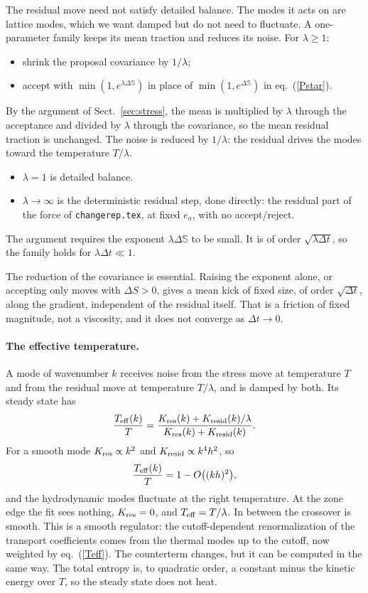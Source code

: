 \documentclass[11pt,aps,preprint,nofootinbib,superscriptaddress,tightenlines]{revtex4-2}
\def\st{\begin{equation}}
\def\stp{\end{equation}}
\def\Eq#1{eq.~(\ref{#1})}
\def\Sect#1{Sect.~\ref{#1}}
\let\oldparagraph\paragraph
\renewcommand{\paragraph}{\par\bigskip\oldparagraph}
\begin{document}
The residual move need not satisfy detailed
balance.  The modes it acts on are lattice modes, which we want damped but do
not need to fluctuate.  A one-parameter family keeps its mean traction and
reduces its noise.  For $\lambda\geq1$:
\begin{itemize}
\item shrink the proposal covariance by $1/\lambda$;
\item accept with $\min(1,e^{\lambda\Delta\mathbb S})$ in place of
  $\min(1,e^{\Delta\mathbb S})$ in \Eq{Pstar}.
\end{itemize}
By the argument of \Sect{sec:stress}, the mean is multiplied by $\lambda$ through
the acceptance and divided by $\lambda$ through the covariance, so the mean
residual traction is unchanged.  The noise is reduced by $1/\lambda$: the
residual drives the modes toward the temperature $T/\lambda$.
\begin{itemize}
\item $\lambda=1$ is detailed balance.
\item $\lambda\to\infty$ is the deterministic residual step, done directly: the
  residual part of the force of \texttt{changerep.tex}, at fixed $e_a$, with no
  accept/reject.
\end{itemize}
The argument requires the exponent $\lambda\Delta\mathbb S$ to be small.  It is of
order $\sqrt{\lambda\Delta t}$, so the family holds for $\lambda\Delta t\ll1$.

The reduction of the covariance is essential.  Raising the exponent alone, or
accepting only moves with $\Delta S>0$, gives a mean kick of fixed size, of order
$\sqrt{\Delta t}$, along the gradient, independent of the residual itself.
That is a friction of fixed magnitude, not a viscosity, and it does not
converge as $\Delta t\to0$.

\paragraph{The effective temperature.}  A mode of wavenumber $k$ receives noise
from the stress move at temperature $T$ and from the residual move at
temperature $T/\lambda$, and is damped by both.  Its steady state has
\st
\frac{T_{\rm eff}(k)}{T}=\frac{K_{\rm res}(k)+K_{\rm resid}(k)/\lambda}{K_{\rm res}(k)+K_{\rm resid}(k)} .
\label{Teff}
\stp
For a smooth mode $K_{\rm res}\propto k^2$ and $K_{\rm resid}\propto k^4h^2$, so
\st
\frac{T_{\rm eff}(k)}{T}=1-O\big((kh)^2\big) ,
\stp
and the hydrodynamic modes fluctuate at the right temperature.  At the zone
edge the fit sees nothing, $K_{\rm res}=0$, and $T_{\rm eff}=T/\lambda$.  In
between the crossover is smooth.  This is a smooth regulator: the
cutoff-dependent renormalization of the transport coefficients comes from the
thermal modes up to the cutoff, now weighted by \Eq{Teff}.  The counterterm
changes, but it can be computed in the same way.  The total entropy is, to
quadratic order, a constant minus the kinetic energy over $T$, so the steady
state does not heat.
\end{document}
